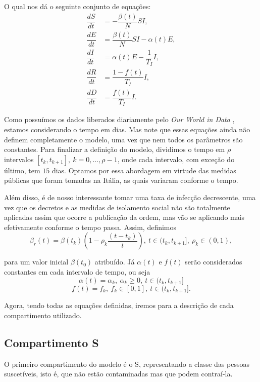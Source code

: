 \documentclass{article}
\begin{document}
O qual nos dá o seguinte conjunto de equações:
\begin{equation}
    \label{fSEIRD}
    \begin{split}
        \dfrac{dS}{dt} & = -\dfrac{\beta(t)}{N}SI, \\
        \dfrac{dE}{dt} & = \dfrac{\beta(t)}{N}SI - \alpha(t) E, \\
        \dfrac{dI}{dt} & = \alpha(t) E - \dfrac{1}{T_I}I, \\
        \dfrac{dR}{dt} & = \dfrac{1 - f(t)}{T_I}I, \\
        \dfrac{dD}{dt} & = \dfrac{f(t)}{T_I}I.
    \end{split}
\end{equation}

Como possuímos os dados liberados diariamente pelo \textit{Our World in Data} \cite{owid}, estamos considerando o tempo em dias. Mas note que essas equações ainda não definem completamente o modelo, uma vez que nem todos os parâmetros são constantes. Para finalizar a definição do modelo, dividimos o tempo em $\rho$ intervalos $[t_k, t_{k + 1}], ~k = 0, \dots, \rho -1$, onde cada intervalo, com exceção do último, tem $15$ dias. Optamos por essa abordagem em virtude das medidas públicas que foram tomadas na Itália, as quais variaram conforme o tempo.

Além disso, é de nosso interessante tomar uma taxa de infecção decrescente, uma vez que os decretos e as medidas de isolamento social não são totalmente aplicadas assim que ocorre a publicação da ordem, mas vão se aplicando mais efetivamente conforme o tempo passa. Assim, definimos
\[\beta_r(t) = \beta(t_k)\left(1 - \rho_k\dfrac{(t - t_k)}{t}\right), ~t \in (t_k, t_{k + 1}], ~\rho_k \in (0, 1),\]

\noindent para um valor inicial $\beta(t_0)$ atribuído. Já $\alpha(t)$ e $f(t)$ serão considerados constantes em cada intervalo de tempo, ou seja
\[\alpha(t) = \alpha_k, ~\alpha_k \geq 0, ~t \in (t_k, t_{k + 1}]\]
\[f(t) = f_k, ~f_k \in [0, 1], ~t \in (t_k, t_{k + 1}].\]

Agora, tendo todas as equações definidas, iremos para a descrição de cada compartimento utilizado.

\subsection*{Compartimento S}

O primeiro compartimento do modelo é o S, representando a classe das pessoas suscetíveis, isto é, que não estão contaminadas mas que podem contraí-la.
\end{document}
